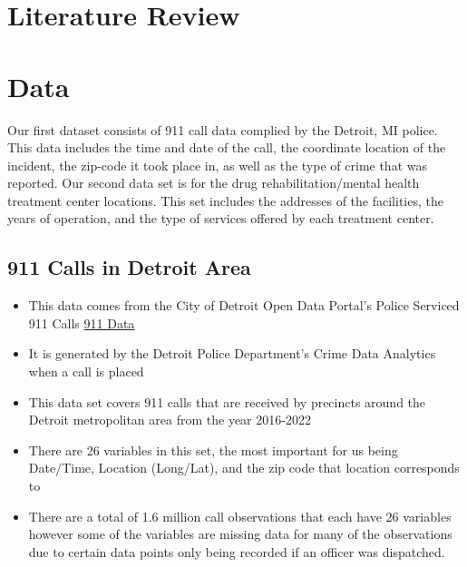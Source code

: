 \documentclass[12pt]{article}
\begin{document}
\section{Literature Review}


\section{Data} \label{sec:literature}

Our first dataset consists of 911 call data complied by the Detroit, MI police. This data includes the time and date of the call, the coordinate location of the incident, the zip-code it took place in, as well as the type of crime that was reported. Our second data set is for the drug rehabilitation/mental health treatment center locations. This set includes the addresses of the facilities, the years of operation, and the type of services offered by each treatment center.

\subsection{911 Calls in Detroit Area}
\begin{itemize}
  \item This data comes from the City of Detroit Open Data Portal's Police Serviced 911 Calls  \href{https://data.detroitmi.gov/datasets/detroitmi::police-serviced-911-calls/about}{911 Data}
  \item It is generated by the Detroit Police Department's Crime Data Analytics  when a call is placed
  \item This data set covers 911 calls that are received by precincts around the Detroit metropolitan area from the year 2016-2022
  \item There are 26 variables in this set, the most important for us being Date/Time, Location (Long/Lat), and the zip code that location corresponds to
  \item There are a total of 1.6 million call observations that each have 26 variables however some of the variables are missing data for many of the observations due to certain data points only being recorded if an officer was dispatched.
\end{itemize}
\end{document}

